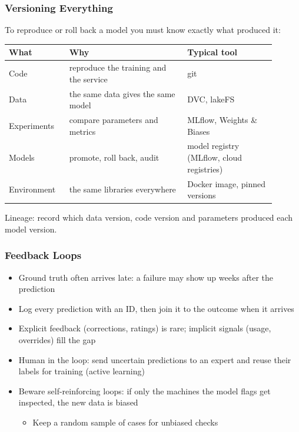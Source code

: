 \begin{frame}[fragile]\frametitle{Versioning Everything}
To reproduce or roll back a model you must know exactly what produced it:
\begin{center}
\small\renewcommand{\arraystretch}{1.35}
\begin{tabular}{>{\raggedright\arraybackslash}p{0.2\linewidth}>{\raggedright\arraybackslash}p{0.4\linewidth}>{\raggedright\arraybackslash}p{0.3\linewidth}}
\hline
\textbf{What} & \textbf{Why} & \textbf{Typical tool} \\
\hline
Code & reproduce the training and the service & git \\
Data & the same data gives the same model & DVC, lakeFS \\
Experiments & compare parameters and metrics & MLflow, Weights \& Biases \\
Models & promote, roll back, audit & model registry (MLflow, cloud registries) \\
Environment & the same libraries everywhere & Docker image, pinned versions \\
\hline
\end{tabular}
\end{center}
Lineage: record which data version, code version and parameters produced each model version.
\end{frame}

\begin{frame}[fragile]\frametitle{Feedback Loops}
\begin{itemize}
\item Ground truth often arrives late: a failure may show up weeks after the prediction
\item Log every prediction with an ID, then join it to the outcome when it arrives
\item Explicit feedback (corrections, ratings) is rare; implicit signals (usage, overrides) fill the gap
\item Human in the loop: send uncertain predictions to an expert and reuse their labels for training (active learning)
\item Beware self-reinforcing loops: if only the machines the model flags get inspected, the new data is biased
\begin{itemize}
\item Keep a random sample of cases for unbiased checks
\end{itemize}
\end{itemize}
\end{frame}

